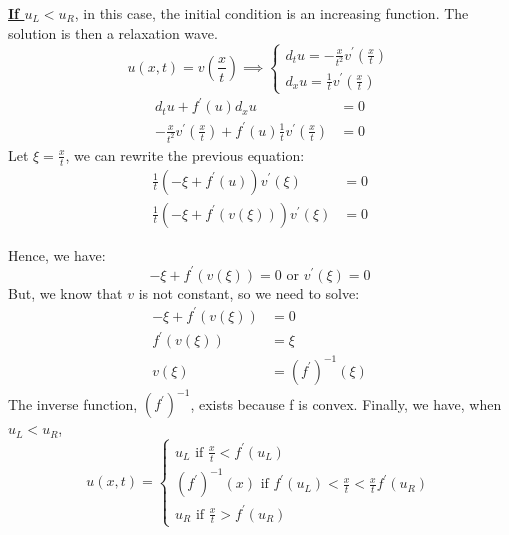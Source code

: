         \underline{\boldmath \bf If $u_L < u_R$}, in this case, the initial condition is an increasing function. The solution is then a relaxation wave.
        \begin{equation}
                 u\left(x,t\right) = v\left(\frac{x}{t}\right) \implies
                 \begin{cases}
                    d_t u = -\frac{x}{t^2}v^\prime\left(\frac{x}{t}\right) \\
                    d_x u =  \frac{1}{t}v^\prime\left(\frac{x}{t}\right)
                \end{cases}  
        \end{equation}
        \begin{align*}
            d_t u + f^\prime\left(u\right)d_x u &=0 \\
            -\frac{x}{t^2}v^\prime\left(\frac{x}{t}\right) + f^\prime\left(u\right)\frac{1}{t}v^\prime\left(\frac{x}{t}\right) &= 0
        \end{align*}
        Let $\xi= \frac{x}{t}$, we can rewrite the previous equation:
        \begin{align*}
            \frac{1}{t}\left(-\xi + f^\prime\left(u\right)\right)v^\prime\left(\xi\right)&=0 \\
            \frac{1}{t}\left(  -\xi + f^\prime\left(v\left(\xi\right)\right)\right)v^\prime\left(\xi   \right)&=0
        \end{align*}
        
        Hence, we have:
        \begin{equation}
            -\xi + f^\prime\left(v\left(\xi\right)\right) = 0 \text{ or } v^\prime\left(\xi\right)=0
        \end{equation}
        But, we know that $v$ is not constant, so we need to solve:
        \begin{align*}
            -\xi + f^\prime\left(v\left(\xi\right)\right) &= 0 \\
            f^\prime\left(v\left(\xi\right)\right) &= \xi \\
            v\left(\xi\right) &= \left(f^\prime\right)^{-1}\left(\xi\right)
        \end{align*}
        The inverse function, $\left(f^\prime\right)^{-1}$, exists because f is convex.
        Finally, we have, when $u_L < u_R$, 
        \begin{equation*}
             \boxed{
            u(x,t)=
            \begin{cases}
                u_L \text{ if } \frac{x}{t} < f^\prime(u_L)\\
                \left(f^\prime\right)^{-1}\left(x\right) \text{ if } f^\prime(u_L)<\frac{x}{t} <  \frac{x}{t} f^\prime(u_R)\\
                u_R \text{ if } \frac{x}{t} > f^\prime(u_R)
            \end{cases}
            }
        \end{equation*}
\newpage

